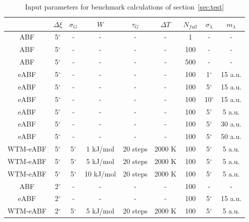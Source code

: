 \begin{table}[H]
      \centering
         \caption{Input parameters for benchmark calculations of section~\ref{sec:test}}
         \begin{tabular}{ c | c  c  c  c  c c c c}
                 & $\Delta \xi$ & $\sigma_{G}$ & $W$ & $\tau_G$ & $\Delta T$ & $N_{full}$ & $\sigma_\lambda$ & $m_\lambda$   \\
                 \hline
            ABF      & 5$^\circ$ &  -       & -          & -        & -      & 1 & - & - \\
            ABF      & 5$^\circ$ &  -       & -          & -        & -      & 100 & - & - \\
            ABF      & 5$^\circ$ &  -       & -          & -        & -      & 500 & - & - \\
            eABF     & 5$^\circ$ &  -       & -          & -        & -      & 100 & 1$^\circ$ & 15 a.u. \\
            eABF     & 5$^\circ$ &  -       & -          & -        & -      & 100 & 5$^\circ$ & 15 a.u. \\
            eABF     & 5$^\circ$ &  -       & -          & -        & -      & 100 & 10$^\circ$ & 15 a.u. \\
            eABF     & 5$^\circ$ &  -       & -          & -        & -      & 100 & 5$^\circ$ & 5 a.u. \\
            eABF     & 5$^\circ$ &  -       & -          & -        & -      & 100 & 5$^\circ$ & 30 a.u. \\
            eABF     & 5$^\circ$ &  -       & -          & -        & -      & 100 & 5$^\circ$ & 50 a.u. \\
            WTM-eABF & 5$^\circ$ & 5$^\circ$ & 1 kJ/mol & 20 steps & 2000 K & 100 & 5$^\circ$ & 5 a.u. \\
            WTM-eABF & 5$^\circ$ & 5$^\circ$ & 5 kJ/mol & 20 steps & 2000 K & 100 & 5$^\circ$ & 5 a.u. \\
            WTM-eABF & 5$^\circ$ & 5$^\circ$ & 10 kJ/mol & 20 steps & 2000 K & 100 & 5$^\circ$ & 5 a.u. \\
            ABF      & 2$^\circ$ &  -       & -          & -        & -      & 100 & - & - \\
            eABF     & 2$^\circ$ &  -       & -          & -        & -      & 100 & 5$^\circ$ & 15 a.u. \\
            WTM-eABF & 2$^\circ$ & 5$^\circ$ & 5 kJ/mol & 20 steps & 2000 K & 100 & 5$^\circ$ & 5 a.u. \\
      \end{tabular}
      \label{tab:benchmark params}
\end{table}
